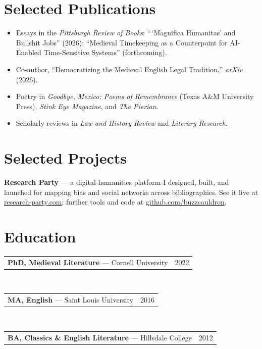 \documentclass[11pt,letterpaper]{article}
\makeatletter
\newcommand{\edu}[3]{%
  \noindent\begin{tabularx}{\linewidth}{@{}X r@{}}%
    \textbf{#1} \textnormal{— #2} & #3\\
  \end{tabularx}}
\makeatother
\begin{document}
\section{Selected Publications}
\begin{itemize}
  \item Essays in the \textit{Pittsburgh Review of Books}: ``\,`Magnifica Humanitas' and Bullshit Jobs'' (2026); ``Medieval Timekeeping as a Counterpoint for AI-Enabled Time-Sensitive Systems'' (forthcoming).
  \item Co-author, ``Democratizing the Medieval English Legal Tradition,'' \textit{arXiv} (2026).
  \item Poetry in \textit{Goodbye, Mexico: Poems of Remembrance} (Texas A\&M University Press), \textit{Stink Eye Magazine}, and \textit{The Pierian}.
  \item Scholarly reviews in \textit{Law and History Review} and \textit{Literary Research}.
\end{itemize}

\section{Selected Projects}
\textbf{Research Party} --- a digital-humanities platform I designed, built, and launched for mapping bias and social networks across bibliographies. See it live at \href{https://research-party.com}{research-party.com}; further tools and code at \href{https://github.com/buzzcauldron}{github.com/buzzcauldron}.

\section{Education}
\edu{PhD, Medieval Literature}{Cornell University}{2022}\\[3pt]
\edu{MA, English}{Saint Louis University}{2016}\\[3pt]
\edu{BA, Classics \& English Literature}{Hillsdale College}{2012}
\end{document}
